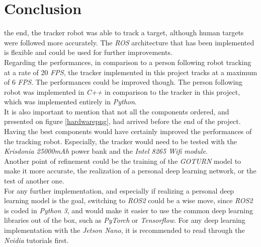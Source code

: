 \clearpage

\section*{Conclusion}

\begin{comment}
	
	Compare to the paper on the person following which had a 20 Fps. (check whether or not they did it in c++)
	What has been implemented and what has not been implemented.
 E	Ideas for further development : ROS2, c++

\end{comment}

 the end, the tracker robot was able to track 
a target, although human targets were followed 
more accurately. The \textit{ROS} architecture
that has been implemented is flexible and could
be used for further improvements.
\\\indent Regarding the performances, in 
comparison to a person following robot \cite{personfollowing}
tracking at a rate of 20 \textit{FPS}, the tracker
implemented in this project tracks at a maximum of 6 \textit{FPS}.
The performances could be improved though. The person 
following robot was implemented in \textit{C++} in 
comparison to the tracker in this project, which was 
implemented entirely in \textit{Python}.
\\\indent It is also important to mention that not 
all the components ordered, and presented on 
figure \vref{hardwarepng}, had arrived before
the end of the project. Having the best components would 
have certainly improved the performances
of the tracking robot. Especially, the tracker 
would need to be tested with the \textit{Krisdonia 25000mAh}
power bank and the \textit{Intel 8265 Wifi module}.
\\\indent Another point of refinement could be the 
training of the \textit{GOTURN} model to make 
it more accurate, the realization of a personal 
deep learning network, or the test of another one.
\\\indent For any further implementation, 
and especially if realizing a personal 
deep learning model is the goal, switching to \textit{ROS2}
could be a wise move, since \textit{ROS2}
is coded in \textit{Python 3}, and would make it easier to 
use the common deep learning libraries out of the box, such 
as \textit{PyTorch} or \textit{Tensorflow}. 
For any deep learning implementation with the \textit{Jetson Nano}, 
it is recommended to read through the \textit{Nvidia} tutorials  first\cite{dptuto}.